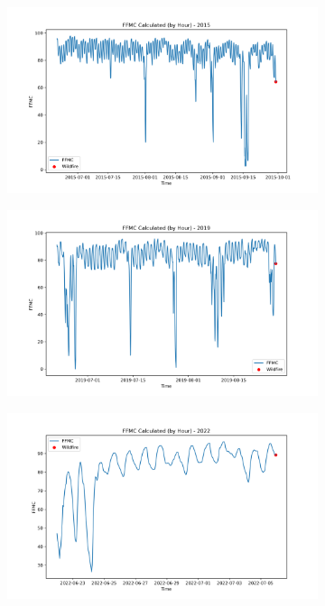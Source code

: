 \begin{figure}[h]
	\label{fig:hourly_fwi}
\end{figure}

\begin{figure}[h]
	\centering
	\caption{Calculated hourly FFMC value for 2015, 2019, and 2022}
	\begin{subfigure}{0.45\textwidth}
		\centering
		\includegraphics[width=\textwidth]{graphs/2015/byHour/2015CalcFFMC12.png}
	\end{subfigure}
	\hfill
	\begin{subfigure}{0.45\textwidth}
		\centering
		\includegraphics[width=\textwidth]{graphs/2019/2019CalcFFMC12.png}
	\end{subfigure}
	\hfill
	\begin{subfigure}{0.45\textwidth}
		\centering
		\includegraphics[width=\textwidth]{graphs/2022/2022CalcFFMC12.png}
	\end{subfigure}
	\label{fig:hourly_ffmc}
\end{figure}

